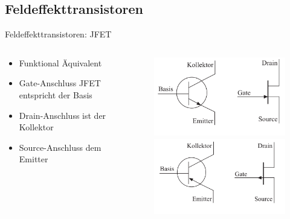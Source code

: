 \documentclass[12pt%
,aspectratio=169%
]{beamer}
\begin{document}
\subsection{Feldeffekttransistoren}
\begin{frame}{Feldeffekttransistoren: JFET}
\begin{columns}[T] %
\begin{column}{.58\textwidth}
	\begin{itemize}
		\item Funktional Äquivalent
		\item Gate-Anschluss JFET entspricht der Basis
		\item Drain-Anschluss ist der Kollektor
		\item Source-Anschluss dem Emitter
	\end{itemize}
\end{column}%
\hfill%
\begin{column}{.38\textwidth}
\begin{figure}
\center
\includegraphics[scale=0.4]{pictures/npn_jfet}\\
\includegraphics[scale=0.4]{pictures/pnp_jfet}
\end{figure}
\end{column}%
\end{columns}
\end{frame}
\end{document}
